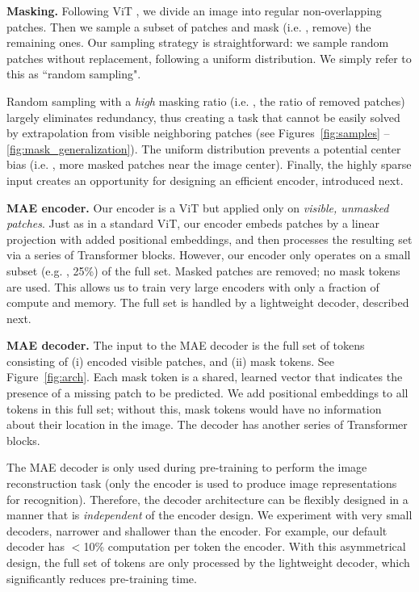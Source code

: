 \textbf{Masking.} Following ViT \cite{Dosovitskiy2021}, we divide an image into regular non-overlapping patches. Then we sample a subset of patches and mask (i.e. , remove) the remaining ones. Our sampling strategy is straightforward: we sample random patches without replacement, following a uniform distribution. We simply refer to this as ``random sampling".

Random sampling with a \textit{high} masking ratio (i.e. , the ratio of removed patches) largely eliminates redundancy, thus creating a task that cannot be easily solved by extrapolation from visible neighboring patches (see Figures~\ref{fig:samples} -- \ref{fig:mask_generalization}). The uniform distribution prevents a potential center bias (i.e. , more masked patches near the image center). Finally, the highly sparse input creates an opportunity for designing an efficient encoder, introduced next.

\textbf{MAE encoder.} Our encoder is a ViT \cite{Dosovitskiy2021} but applied only on \emph{visible, unmasked patches}. Just as in a standard ViT, our encoder embeds patches by a linear projection with added positional embeddings, and then processes the resulting set via a series of Transformer blocks. However, our encoder only operates on a small subset (e.g. , 25\%) of the full set. Masked patches are removed; no mask tokens are used. This allows us to train very large encoders with only a fraction of compute and memory. The full set is handled by a lightweight decoder, described next.

\textbf{MAE decoder.} The input to the MAE decoder is the full set of tokens consisting of (i) encoded visible patches, and (ii) mask tokens. See Figure~\ref{fig:arch}. Each mask token \cite{Devlin2019} is a shared, learned vector that indicates the presence of a missing patch to be predicted. We add positional embeddings to all tokens in this full set; without this, mask tokens would have no information about their location in the image. The decoder has another series of Transformer blocks.

The MAE decoder is only used during pre-training to perform the image reconstruction task (only the encoder is used to produce image representations for recognition). Therefore, the decoder architecture can be flexibly designed in a manner that is \emph{independent} of the encoder design. We experiment with very small decoders, narrower and shallower than the encoder. For example, our default decoder has $<$10\% computation per token \vs the encoder. With this asymmetrical design, the full set of tokens are only processed by the lightweight decoder, which significantly reduces pre-training time.

